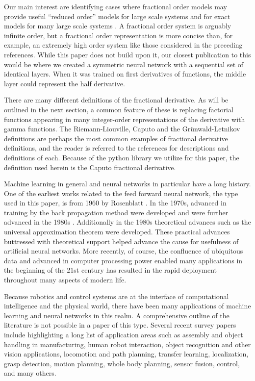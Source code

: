   Our main interest are identifying cases where fractional order models may
  provide useful ``reduced order'' models for large scale systems
  \cite{goodwinemed2023,goodwinemmar2023} and for exact models for many large
  scale systems
  \cite{Goodwine2014Modeling,Leyden2016Using,Leyden2019Large,bg:xnids2022,bg:xninonlinear2020}.
  A fractional order system is arguably infinite order, but a fractional order
  representation is more concise than, for example, an extremely high order
  system like those considered in the preceding references.  While this paper
  does not build upon it, our closest publication to this would be
  \cite{bg:chenSII2022} where we created a symmetric neural network with a
  sequential set of identical layers. When it was trained on first derivatives
  of functions, the middle layer could represent the half derivative. 
 
 There are many different definitions of the fractional derivative. As will be
 outlined in the next section, a common feature of these is replacing factorial
 functions appearing in many integer-order representations of the derivative
 with gamma functions. The Riemann-Liouville, Caputo and the Gr\"unwald-Letnikov
 definitions are perhaps the most common examples of fractional derivative
 definitions, and the reader is referred to the references
 \cite{Machado20111140,4609961,series/lnee/Ortigueira11,das2011functional} for
 descriptions and definitions of each. Because of the python library we utilize
 for this paper, the definition used herein is the Caputo fractional derivative. 

 Machine learning in general and neural networks in particular have a long
 history. One of the earliest works related to the feed forward neural network,
 the type used in this paper, is from 1960 by Rosenblatt \cite{Rosenblatt1960}.
 In the 1970s, advanced in training by the back propagation method were
 developed \cite{linnainmaa1} and were further advanced in the 1980s
 \cite{werbos}.  Additionally in the 1980s theoretical advances such as the
 universal approximation theorem \cite{hornik1989multilayer} were developed.
 These practical advances buttressed with theoretical support helped advance the
 cause for usefulness of artificial neural networks. More recently, of course,
 the confluence of ubiquitous data and advanced in computer processing power
 enabled many applications in the beginning of the 21st century has resulted in
 the rapid deployment throughout many aspects of modern life. 

 Because robotics and control systems are at the interface of computational
 intelligence and the physical world, there have been many applications of
 machine learning and neural networks in this realm. A comprehensive outline of
 the literature is not possible in a paper of this type. Several recent survey
 papers include \cite{semeraro,9199280,bai} highlighting a long list of
 application areas such as assembly and object handling in manufacturing, human
 robot interaction, object recognition and other vision applications, locomotion
 and path planning, transfer learning, localization, grasp detection, motion
 planning, whole body planning, sensor fusion, control, and many others.

